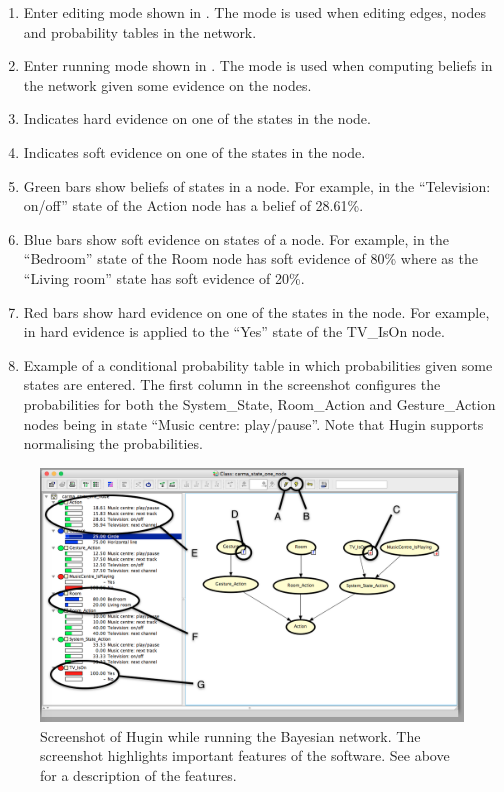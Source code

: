 \begin{enumerate}[label=\Alph*.]
\item Enter editing mode shown in . The mode is used when editing edges, nodes and probability tables in the network.
\item Enter running mode shown in . The mode is used when computing beliefs in the network given some evidence on the nodes.
\item Indicates hard evidence on one of the states in the node.
\item Indicates soft evidence on one of the states in the node.
\item Green bars show beliefs of states in a node. For example, in  the ``Television: on/off'' state of the Action node has a belief of 28.61\%.
\item Blue bars show soft evidence on states of a node. For example, in  the ``Bedroom'' state of the Room node has soft evidence of 80\% where as the ``Living room'' state has soft evidence of 20\%.
\item Red bars show hard evidence on one of the states in the node. For example, in  hard evidence is applied to the ``Yes'' state of the TV\_IsOn node.
\item Example of a conditional probability table in which probabilities given some states are entered. The first column in the screenshot configures the probabilities for both the System\_State, Room\_Action and Gesture\_Action nodes being in state ``Music centre: play/pause''. Note that Hugin supports normalising the probabilities.
\end{enumerate}

\begin{figure}[h!]
\centering
\includegraphics[width=\textwidth]{images/hugin-functionality-running}
\caption{Screenshot of Hugin while running the Bayesian network. The screenshot highlights important features of the software. See above for a description of the features.}
\label{fig:design:bayesian-network:hugin-functionality-running}
\end{figure}

